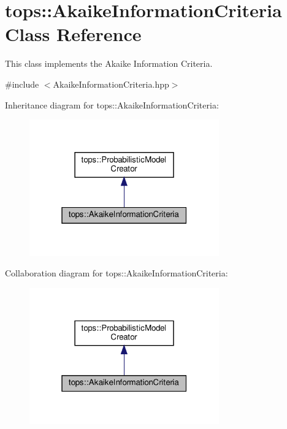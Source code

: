 \hypertarget{classtops_1_1AkaikeInformationCriteria}{}\section{tops\+:\+:Akaike\+Information\+Criteria Class Reference}
\label{classtops_1_1AkaikeInformationCriteria}


This class implements the Akaike Information Criteria.  




{\ttfamily \#include $<$Akaike\+Information\+Criteria.\+hpp$>$}



Inheritance diagram for tops\+:\+:Akaike\+Information\+Criteria\+:
\nopagebreak
\begin{figure}[H]
\begin{center}
\leavevmode
\includegraphics[width=232pt]{classtops_1_1AkaikeInformationCriteria__inherit__graph}
\end{center}
\end{figure}


Collaboration diagram for tops\+:\+:Akaike\+Information\+Criteria\+:
\nopagebreak
\begin{figure}[H]
\begin{center}
\leavevmode
\includegraphics[width=232pt]{classtops_1_1AkaikeInformationCriteria__coll__graph}
\end{center}
\end{figure}

